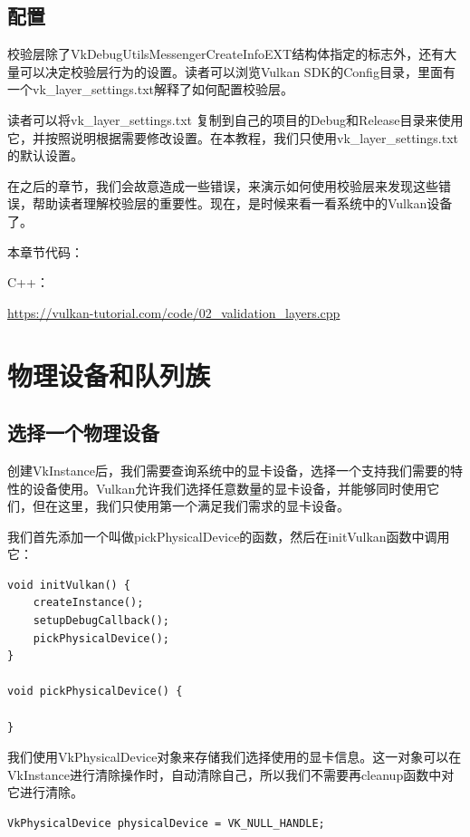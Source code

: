 \documentclass{ctexart}
\begin{document}
\subsection{配置}

校验层除了VkDebugUtilsMessengerCreateInfoEXT结构体指定的标志外，还有大量可以决定校验层行为的设置。读者可以浏览Vulkan SDK的Config目录，里面有一个vk\_layer\_settings.txt解释了如何配置校验层。

读者可以将vk\_layer\_settings.txt 复制到自己的项目的Debug和Release目录来使用它，并按照说明根据需要修改设置。在本教程，我们只使用vk\_layer\_settings.txt的默认设置。

在之后的章节，我们会故意造成一些错误，来演示如何使用校验层来发现这些错误，帮助读者理解校验层的重要性。现在，是时候来看一看系统中的Vulkan设备了。

本章节代码：

C++：

\url{https://vulkan-tutorial.com/code/02_validation_layers.cpp}

\newpage
\section{物理设备和队列族}

\subsection{选择一个物理设备}


创建VkInstance后，我们需要查询系统中的显卡设备，选择一个支持我们需要的特性的设备使用。Vulkan允许我们选择任意数量的显卡设备，并能够同时使用它们，但在这里，我们只使用第一个满足我们需求的显卡设备。

我们首先添加一个叫做pickPhysicalDevice的函数，然后在initVulkan函数中调用它：

\begin{lstlisting}[language={[ANSI]C}]
void initVulkan() {
	createInstance();
	setupDebugCallback();
	pickPhysicalDevice();
}

void pickPhysicalDevice() {

}
\end{lstlisting}

我们使用VkPhysicalDevice对象来存储我们选择使用的显卡信息。这一对象可以在VkInstance进行清除操作时，自动清除自己，所以我们不需要再cleanup函数中对它进行清除。

\begin{lstlisting}[language={[ANSI]C}]
VkPhysicalDevice physicalDevice = VK_NULL_HANDLE;
\end{lstlisting}
\end{document}
